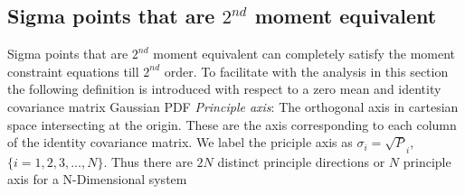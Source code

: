 \documentclass[letterpaper, 10 pt, conference]{ieeeconf}  %
\begin{document}
\subsection{Sigma points that are $2^{nd}$ moment equivalent}
Sigma points that are $2^{nd}$ moment equivalent can completely satisfy the moment constraint equations till $2^{nd}$ order. To facilitate with the analysis in this section the following definition is introduced with respect to a zero mean and identity covariance matrix Gaussian PDF \newline 
\emph{Principle axis}: The orthogonal axis in cartesian space intersecting at the origin. These are the axis corresponding to each column of the identity covariance matrix. We label the priciple axis as $\sigma_i=\sqrt{P}_i$, $\{i=1,2,3,...,N\}$. Thus there are $2N$ distinct principle directions or $N$ principle axis for a N-Dimensional system 

\end{document}
